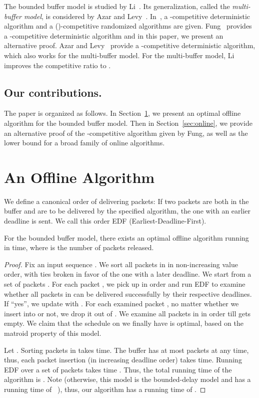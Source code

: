 \documentclass[final, 11pt]{article}
\begin{document}
The bounded buffer model is studied by Li~\cite{L09}. Its generalization, called the {\em multi-buffer model}, is considered by Azar and Levy~\cite{AL06}. In~\cite{L09}, a -competitive deterministic algorithm and a ()-competitive randomized algorithms are given. Fung~\cite{F09} provides a -competitive deterministic algorithm and in this paper, we present an alternative proof. Azar and Levy~\cite{AL06} provide a -competitive deterministic algorithm, which also works for the multi-buffer model. For the multi-buffer model, Li~\cite{L09b} improves the competitive ratio to .



\subsection{Our contributions.}

The paper is organized as follows. In Section~\ref{sec:offline}, we present an optimal offline algorithm for the bounded buffer model. Then in Section~\ref{sec:online}, we provide an alternative proof of the -competitive algorithm given by Fung, as well as the lower bound  for a broad family of online algorithms.



\section{An Offline Algorithm}
\label{sec:offline}

We define a canonical order of delivering packets: If two packets are both in the buffer and are to be delivered by the specified algorithm, the one with an earlier deadline is sent. We call this order EDF (Earliest-Deadline-First).

\begin{theorem}
For the bounded buffer model, there exists an optimal offline algorithm running in  time, where  is the number of packets released.
\end{theorem}

\begin{proof}
Fix an input sequence . We sort all packets in  in non-increasing value order, with ties broken in favor of the one with a later deadline. We start from a set of packets . For each packet , we pick up  in order and run EDF to examine whether all packets in  can be delivered successfully by their respective deadlines. If ``yes'', we update  with . For each examined packet , no matter whether we insert  into  or not, we drop it out of . We examine all packets in  in order till  gets empty. We claim that the schedule on  we finally have is optimal, based on the matroid property of this model.

Let . Sorting packets in  takes  time. The buffer has at most  packets at any time, thus, each packet insertion (in increasing deadline order) takes  time. Running EDF over a set of packets  takes time . Thus, the total running time of the algorithm is . Note  (otherwise, this model is the bounded-delay model and has a running time of ~\cite{KLMPSS04}), thus, our algorithm has a running time of . 
\end{proof}
\end{document}
